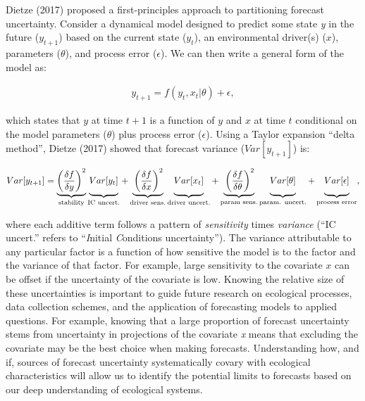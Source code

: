 \documentclass[12pt,]{article}
\begin{document}
Dietze (2017) proposed a first-principles approach to partitioning
forecast uncertainty. Consider a dynamical model designed to predict
some state \emph{y} in the future (\(y_{t+1}\)) based on the current
state (\(y_{t}\)), an environmental driver(s) (\(x\)), parameters
(\(\theta\)), and process error (\(\epsilon\)). We can then write a
general form of the model as: \vspace{-2em}

\begin{align}
y_{t+1} = f(y_t, x_t|\theta) + \epsilon,
\end{align}

\vspace{-2em} which states that \(y\) at time \(t+1\) is a function of
\(y\) and \(x\) at time \(t\) conditional on the model parameters
(\(\theta\)) plus process error (\(\epsilon\)). Using a Taylor expansion
``delta method'', Dietze (2017) showed that forecast variance
(\(Var[y_{t+1}]\)) is: \vspace{-1em}

\begin{align}
Var[y_{t+1}] = \underbrace{\left(\frac{\delta f}{\delta y} \right)^2}_{\text{stability}} 
               \underbrace{\vphantom{ \left(\frac{\delta f}{\delta y} \right)^2 } Var[y_t]}_{\text{IC uncert.}} +
               \underbrace{\vphantom{ \left(\frac{\delta f}{\delta y} \right)^2 }\left(\frac{\delta f}{\delta x} \right)^2}_{\text{driver sens.}} 
               \underbrace{\vphantom{ \left(\frac{\delta f}{\delta y} \right)^2 } Var[x_t]}_{\text{driver uncert.}} +
               \underbrace{\vphantom{ \left(\frac{\delta f}{\delta y} \right)^2 }\left(\frac{\delta f}{\delta \theta} \right)^2}_{\text{param sens.}}
               \underbrace{\vphantom{ \left(\frac{\delta f}{\delta y} \right)^2 } Var[\theta]}_{\text{param. uncert.}} +
               \underbrace{\vphantom{ \left(\frac{\delta f}{\delta y} \right)^2 } Var[\epsilon]}_{\text{process error}},
\end{align}

\vspace{-1em} where each additive term follows a pattern of
\emph{sensitivity} times \emph{variance} (``IC uncert.'' refers to
``\emph{I}nitial \emph{C}onditions uncertainty''). The variance
attributable to any particular factor is a function of how sensitive the
model is to the factor and the variance of that factor. For example,
large sensitivity to the covariate \(x\) can be offset if the
uncertainty of the covariate is low. Knowing the relative size of these
uncertainties is important to guide future research on ecological
processes, data collection schemes, and the application of forecasting
models to applied questions. For example, knowing that a large
proportion of forecast uncertainty stems from uncertainty in projections
of the covariate \emph{x} means that excluding the covariate may be the
best choice when making forecasts. Understanding how, and if, sources of
forecast uncertainty systematically covary with ecological
characteristics will allow us to identify the potential limits to
forecasts based on our deep understanding of ecological systems.
\end{document}

